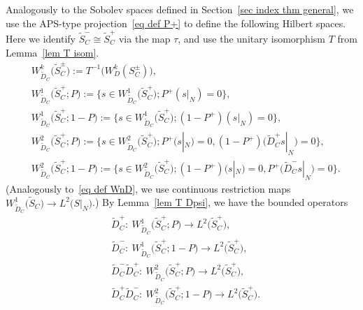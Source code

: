 \documentclass[10pt,a4paper]{amsart}
\numberwithin{equation}{section}
\begin{document}
Analogously to the Sobolev spaces defined in Section~\ref{sec index thm general}, we use the APS-type projection~\eqref{eq def P+} to define the following Hilbert spaces. Here we identify $\widetilde{S}_C^- \cong \widetilde{S}_C^+$ via the map $\tau$, and use the
unitary isomorphism $T$ from Lemma~\ref{lem T isom}.
\begin{align*}
&W^k_{\widetilde{D}_C}\big(\widetilde{S}_C^{\pm}\big) :=T^{-1}\big(W^k_D(S_C^{\pm})\big),
\\
&W^1_{\widetilde{D}_C}\big(\widetilde{S}_C^+; P\big) := \big\{s \in W^1_{\widetilde{D}_C}\big(\widetilde{S}_C^+\big); P^+(s|_N) = 0\big\},
\\
&W^1_{\widetilde{D}_C}\big(\widetilde{S}_C^+;1- P\big) := \big\{s \in W^1_{\widetilde{D}_C}\big(\widetilde{S}_C^+\big); (1-P^+)(s|_N) = 0\big\},
\\
&W^2_{\widetilde{D}_C}\big(\widetilde{S}_C^+; P\big) := \big\{s \in W^2_{\widetilde{D}_C}\big(\widetilde{S}_C^+\big); P^+(s|_N) = 0, (1-P^+)\big(\widetilde{D}_C^+s|_N\big) = 0\big\},
\\
&W^2_{\widetilde{D}_C}\big(\widetilde{S}_C^+; 1-P\big) := \big\{s \in W^2_{\widetilde{D}_C}\big(\widetilde{S}_C^+\big); (1-P^+)(s|_N) = 0, P^+\big(\widetilde{D}_C^-s|_N\big) = 0\big\}.
\end{align*}
\big(Analogously to~\eqref{eq def WnD}, we use continuous restriction maps $W^1_{\widetilde{D}_C}\big(\widetilde{S}_C\big) \to L^2\big(S|_N\big)$.\big)
By Lem\-ma~\ref{lem T Dpsi}, we have the bounded operators
\begin{align}
&\widetilde{D}_C^+\colon\ W^1_{\widetilde{D}_C}\big(\widetilde{S}_C^+; P\big) \to L^2\big(\widetilde{S}_C^+\big), \label{eq D0+ P}\\
&\widetilde{D}_C^-\colon\ W^1_{\widetilde{D}_C}\big(\widetilde{S}_C^+; 1-P\big) \to L^2\big(\widetilde{S}_C^+\big),\label{eq D0- 1-P} \\
&\widetilde{D}_C^- \widetilde{D}_C^+\colon\ W^2_{\widetilde{D}_C}\big(\widetilde{S}_C^+; P\big) \to L^2\big(\widetilde{S}_C^+\big), \label{eq D0-D0+ P}\\
&\widetilde{D}_C^+ \widetilde{D}_C^-\colon\ W^2_{\widetilde{D}_C}\big(\widetilde{S}_C^+; 1-P\big) \to L^2\big(\widetilde{S}_C^+\big).\label{eq D0+D0- 1-P}
\end{align}
\end{document}
